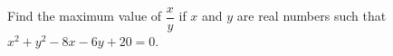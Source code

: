 Find the maximum value of $ \dfrac{x}{y} $ if $ x $ and $ y $ are real numbers such that $ x^2 + y^2 - 8x - 6y + 20 = 0 $.
